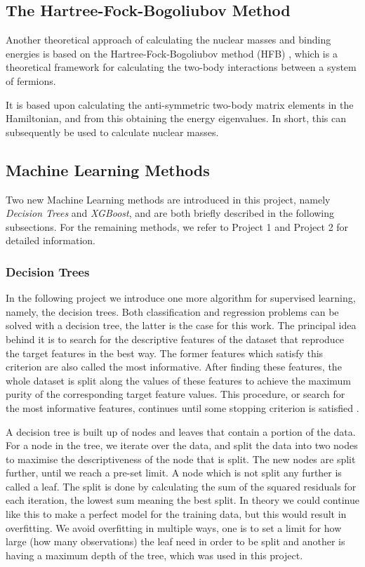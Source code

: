 \documentclass[numberedappendix, twocolappendix]{emulateapj}
\begin{document}
\subsection{The Hartree-Fock-Bogoliubov Method}
\label{sec: HFB}
Another theoretical approach of calculating the nuclear masses and binding energies is based on the Hartree-Fock-Bogoliubov method (HFB) \cite{goriely}, which is a theoretical framework for calculating the two-body interactions between a system of fermions.

It is based upon calculating the anti-symmetric two-body matrix elements in the Hamiltonian, and from this obtaining the energy eigenvalues. In short, this can subsequently be used to calculate nuclear masses.


\subsection{Machine Learning Methods}

Two new Machine Learning methods are introduced in this project, namely \textit{Decision Trees} and \textit{XGBoost}, and are both briefly described in the following subsections. For the remaining methods, we refer to Project  1\cite{proj1_1, proj1_2} and Project 2 \cite{proj2} for detailed information.


\subsubsection{Decision Trees}\label{sec: decision trees}

In the following project we introduce one more algorithm for supervised learning, namely, the decision trees. Both classification and regression problems can be solved with a decision tree, the latter is the case for this work. The principal idea behind it is to search for the descriptive features of the dataset that reproduce the target features in the best way. The former features which satisfy this criterion are also called the most informative. After finding these features, the whole dataset is split along the values of these features to achieve the maximum purity of the corresponding target feature values. This procedure, or search for the most informative features, continues until some stopping criterion is satisfied \cite{Morten}. 


A decision tree is built up of nodes and leaves that contain a portion of the data. For a node in the tree, we iterate over the data, and split the data into two nodes to maximise the descriptiveness of the node that is split. The new nodes are split further, until we reach a pre-set limit. A node which is not split any further is called a leaf. The split is done by calculating the sum of the squared residuals for each iteration, the lowest sum meaning the best split. In theory we could continue like this to make a perfect model for the training data, but this would result in overfitting. We avoid overfitting in multiple ways, one is to set a limit for how large (how many observations) the leaf need in order to be split and another is having a maximum depth of the tree, which was used in this project. 
\end{document}
